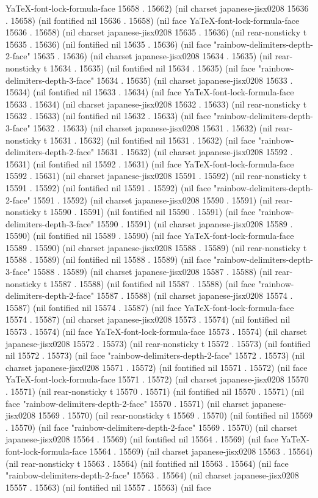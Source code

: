 YaTeX-font-lock-formula-face 15658 . 15662) (nil charset japanese-jisx0208 15636 . 15658) (nil fontified nil 15636 . 15658) (nil face YaTeX-font-lock-formula-face 15636 . 15658) (nil charset japanese-jisx0208 15635 . 15636) (nil rear-nonsticky t 15635 . 15636) (nil fontified nil 15635 . 15636) (nil face "rainbow-delimiters-depth-2-face" 15635 . 15636) (nil charset japanese-jisx0208 15634 . 15635) (nil rear-nonsticky t 15634 . 15635) (nil fontified nil 15634 . 15635) (nil face "rainbow-delimiters-depth-3-face" 15634 . 15635) (nil charset japanese-jisx0208 15633 . 15634) (nil fontified nil 15633 . 15634) (nil face YaTeX-font-lock-formula-face 15633 . 15634) (nil charset japanese-jisx0208 15632 . 15633) (nil rear-nonsticky t 15632 . 15633) (nil fontified nil 15632 . 15633) (nil face "rainbow-delimiters-depth-3-face" 15632 . 15633) (nil charset japanese-jisx0208 15631 . 15632) (nil rear-nonsticky t 15631 . 15632) (nil fontified nil 15631 . 15632) (nil face "rainbow-delimiters-depth-2-face" 15631 . 15632) (nil charset japanese-jisx0208 15592 . 15631) (nil fontified nil 15592 . 15631) (nil face YaTeX-font-lock-formula-face 15592 . 15631) (nil charset japanese-jisx0208 15591 . 15592) (nil rear-nonsticky t 15591 . 15592) (nil fontified nil 15591 . 15592) (nil face "rainbow-delimiters-depth-2-face" 15591 . 15592) (nil charset japanese-jisx0208 15590 . 15591) (nil rear-nonsticky t 15590 . 15591) (nil fontified nil 15590 . 15591) (nil face "rainbow-delimiters-depth-3-face" 15590 . 15591) (nil charset japanese-jisx0208 15589 . 15590) (nil fontified nil 15589 . 15590) (nil face YaTeX-font-lock-formula-face 15589 . 15590) (nil charset japanese-jisx0208 15588 . 15589) (nil rear-nonsticky t 15588 . 15589) (nil fontified nil 15588 . 15589) (nil face "rainbow-delimiters-depth-3-face" 15588 . 15589) (nil charset japanese-jisx0208 15587 . 15588) (nil rear-nonsticky t 15587 . 15588) (nil fontified nil 15587 . 15588) (nil face "rainbow-delimiters-depth-2-face" 15587 . 15588) (nil charset japanese-jisx0208 15574 . 15587) (nil fontified nil 15574 . 15587) (nil face YaTeX-font-lock-formula-face 15574 . 15587) (nil charset japanese-jisx0208 15573 . 15574) (nil fontified nil 15573 . 15574) (nil face YaTeX-font-lock-formula-face 15573 . 15574) (nil charset japanese-jisx0208 15572 . 15573) (nil rear-nonsticky t 15572 . 15573) (nil fontified nil 15572 . 15573) (nil face "rainbow-delimiters-depth-2-face" 15572 . 15573) (nil charset japanese-jisx0208 15571 . 15572) (nil fontified nil 15571 . 15572) (nil face YaTeX-font-lock-formula-face 15571 . 15572) (nil charset japanese-jisx0208 15570 . 15571) (nil rear-nonsticky t 15570 . 15571) (nil fontified nil 15570 . 15571) (nil face "rainbow-delimiters-depth-2-face" 15570 . 15571) (nil charset japanese-jisx0208 15569 . 15570) (nil rear-nonsticky t 15569 . 15570) (nil fontified nil 15569 . 15570) (nil face "rainbow-delimiters-depth-2-face" 15569 . 15570) (nil charset japanese-jisx0208 15564 . 15569) (nil fontified nil 15564 . 15569) (nil face YaTeX-font-lock-formula-face 15564 . 15569) (nil charset japanese-jisx0208 15563 . 15564) (nil rear-nonsticky t 15563 . 15564) (nil fontified nil 15563 . 15564) (nil face "rainbow-delimiters-depth-2-face" 15563 . 15564) (nil charset japanese-jisx0208 15557 . 15563) (nil fontified nil 15557 . 15563) (nil face 